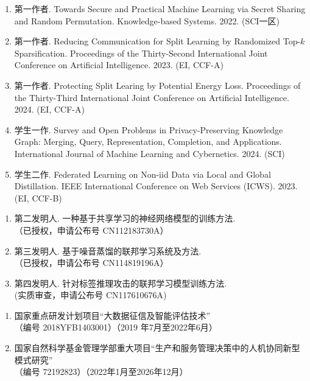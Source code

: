 \cleardoublepage
{}

\begin{enumerate}
    \item 第一作者. Towards Secure and Practical Machine Learning via Secret Sharing and Random Permutation. Knowledge-based Systems. 2022. (SCI一区)
    \item 第一作者. Reducing Communication for Split Learning by Randomized Top-$k$ Sparsification. Proceedings of the Thirty-Second International Joint Conference on Artificial Intelligence. 2023. (EI, CCF-A)
    \item 第一作者. Protecting Split Learing by Potential Energy Loss. Proceedings of the Thirty-Third International Joint Conference on Artificial Intelligence. 2024. (EI, CCF-A)
    \item 学生一作. Survey and Open Problems in Privacy-Preserving Knowledge Graph: Merging, Query, Representation, Completion, and Applications. International Journal of Machine Learning and Cybernetics. 2024. (SCI)
    \item 学生二作. Federated Learning on Non-iid Data via Local and Global Distillation. IEEE International Conference on Web Services (ICWS). 2023. (EI, CCF-B)
\end{enumerate}

\begin{enumerate}
    \item 第二发明人. 一种基于共享学习的神经网络模型的训练方法. \\
    （已授权，申请公布号 CN112183730A）
    \item 第三发明人. 基于噪音蒸馏的联邦学习系统及方法. \\
    （已授权，申请公布号
     CN114819196A）
    \item 第四发明人. 针对标签推理攻击的联邦学习模型训练方法. \\
    (实质审查，申请公布号 CN117610676A)
\end{enumerate}



\begin{enumerate}
    \item 国家重点研发计划项目“大数据征信及智能评估技术”\\
    （编号 2018YFB1403001）（2019 年7月至2022年6月）
    \item 国家自然科学基金管理学部重大项目“生产和服务管理决策中的人机协同新型模式研究”\\
    （编号 72192823）（2022年1月至2026年12月）
\end{enumerate}